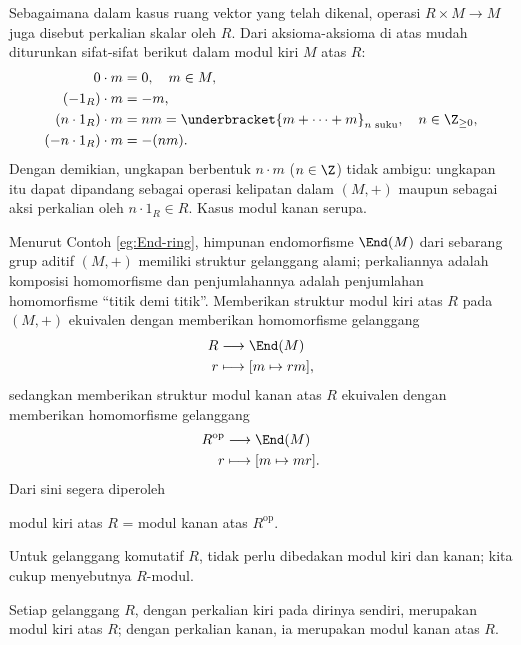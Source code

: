 Sebagaimana dalam kasus ruang vektor yang telah dikenal, operasi $R \times M \to M$ juga disebut perkalian skalar oleh $R$. Dari aksioma-aksioma di atas mudah diturunkan sifat-sifat berikut dalam modul kiri $M$ atas $R$:
\begin{equation}\label{eqn:multiples-in-module}\begin{aligned}
	0 \cdot m & = 0, \quad m \in M, \\
	(-1_R) \cdot m & = -m, \\
	(n \cdot 1_R) \cdot m & = nm = \underbracket{m + \cdots + m}_{n\text{ suku}}, \quad n \in \Z_{\geq 0}, \\
	(-n \cdot 1_R) \cdot m & = -(nm).
\end{aligned}\end{equation}
Dengan demikian, ungkapan berbentuk $n \cdot m$ ($n \in \Z$) tidak ambigu: ungkapan itu dapat dipandang sebagai operasi kelipatan dalam $(M,+)$ maupun sebagai aksi perkalian oleh $n \cdot 1_R \in R$. Kasus modul kanan serupa.

\begin{remark}\label{rem:module-multiplication}
	Menurut Contoh \ref{eg:End-ring}, himpunan endomorfisme $\End(M)$ dari sebarang grup aditif $(M, +)$ memiliki struktur gelanggang alami; perkaliannya adalah komposisi homomorfisme dan penjumlahannya adalah penjumlahan homomorfisme ``titik demi titik''. Memberikan struktur modul kiri atas $R$ pada $(M,+)$ ekuivalen dengan memberikan homomorfisme gelanggang
	\begin{align*}
		R & \longrightarrow \End(M) \\
		r & \longmapsto [m \mapsto rm],
	\end{align*}
	sedangkan memberikan struktur modul kanan atas $R$ ekuivalen dengan memberikan homomorfisme gelanggang
	\begin{align*}
		R^\text{op} & \longrightarrow \End(M) \\
		r & \longmapsto [m \mapsto mr].
	\end{align*}
	Dari sini segera diperoleh
	\begin{center}
		modul kiri atas $R$ = modul kanan atas $R^\text{op}$.
	\end{center}
	Untuk gelanggang komutatif $R$, tidak perlu dibedakan modul kiri dan kanan; kita cukup menyebutnya $R$-modul.
\end{remark}

\begin{example}
	Setiap gelanggang $R$, dengan perkalian kiri pada dirinya sendiri, merupakan modul kiri atas $R$; dengan perkalian kanan, ia merupakan modul kanan atas $R$.
\end{example}

